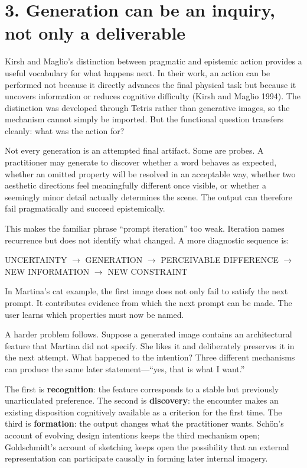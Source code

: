 \documentclass[
  11pt,
  letterpaper,
]{article}
\begin{document}
\section{3. Generation can be an inquiry, not only a
deliverable}\label{generation-can-be-an-inquiry-not-only-a-deliverable}

Kirsh and Maglio's distinction between pragmatic and epistemic action
provides a useful vocabulary for what happens next. In their work, an
action can be performed not because it directly advances the final
physical task but because it uncovers information or reduces cognitive
difficulty (Kirsh and Maglio 1994). The distinction was developed
through Tetris rather than generative images, so the mechanism cannot
simply be imported. But the functional question transfers cleanly: what
was the action for?

Not every generation is an attempted final artifact. Some are probes. A
practitioner may generate to discover whether a word behaves as
expected, whether an omitted property will be resolved in an acceptable
way, whether two aesthetic directions feel meaningfully different once
visible, or whether a seemingly minor detail actually determines the
scene. The output can therefore fail pragmatically and succeed
epistemically.

This makes the familiar phrase ``prompt iteration'' too weak. Iteration
names recurrence but does not identify what changed. A more diagnostic
sequence is:

\begin{center}
UNCERTAINTY $\rightarrow$ GENERATION $\rightarrow$ PERCEIVABLE DIFFERENCE $\rightarrow$ NEW INFORMATION $\rightarrow$ NEW CONSTRAINT
\end{center}

In Martina's cat example, the first image does not only fail to satisfy
the next prompt. It contributes evidence from which the next prompt can
be made. The user learns which properties must now be named.

A harder problem follows. Suppose a generated image contains an
architectural feature that Martina did not specify. She likes it and
deliberately preserves it in the next attempt. What happened to the
intention? Three different mechanisms can produce the same later
statement---``yes, that is what I want.''

The first is \textbf{recognition}: the feature corresponds to a stable
but previously unarticulated preference. The second is
\textbf{discovery}: the encounter makes an existing disposition
cognitively available as a criterion for the first time. The third is
\textbf{formation}: the output changes what the practitioner wants.
Schön's account of evolving design intentions keeps the third mechanism
open; Goldschmidt's account of sketching keeps open the possibility that
an external representation can participate causally in forming later
internal imagery.
\end{document}
